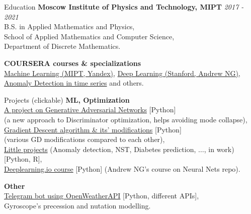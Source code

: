\documentclass{resume} %
\begin{document}

\begin{rSection}{Education}
{\bf Moscow Institute of Physics and Technology, MIPT} \hfill {\em 2017 - 2021} 
\\ B.S. in Applied Mathematics and Physics,
\\ School of Applied Mathematics and Computer Science,
\\ Department of Discrete Mathematics.


{\bf COURSERA courses \& specializations}
\\ \href{https://www.coursera.org/specializations/machine-learning-data-analysis}{Machine Learning (MIPT, Yandex)}, \href{https://www.coursera.org/specializations/deep-learning}{Deep Learning (Stanford, Andrew NG)}, \href{https://www.coursera.org/projects/anomaly-detection-time-series-keras}{Anomaly Detection in time series} and others.
\end{rSection}

\begin{rSection}{Projects (clickable)}
{\bf ML, Optimization}
\\\href{https://github.com/yk4r2/GAN/blob/master/textFiles/Project.pdf}{A project on Generative Adversarial Networks} [Python]\\
(a new approach to Discriminator optimization, helps avoiding mode collapse),
\\\href{https://github.com/yk4r2/gradDesc/}{Gradient Descent algorithm \& its' modifications} [Python]\\
(various GD modifications compared to each other),
\\\href{https://github.com/yk4r2/LittleProjects}{Little projects} (Anomaly detection, NST, Diabetes prediction, $\dots$, in work) [Python, R],
\\\href{https://github.com/yk4r2/DeepLearningCoursera}{Deeplearning.io course} [Python]
(Andrew NG's course on Neural Nets repo).

{\bf Other}
\\\href{https://github.com/yk4r2/YandexWeatherBot}{Telegram bot using OpenWeatherAPI} [Python, different APIs],
\\Gyroscope's precession and nutation modelling.
\end{rSection}
\end{document}
